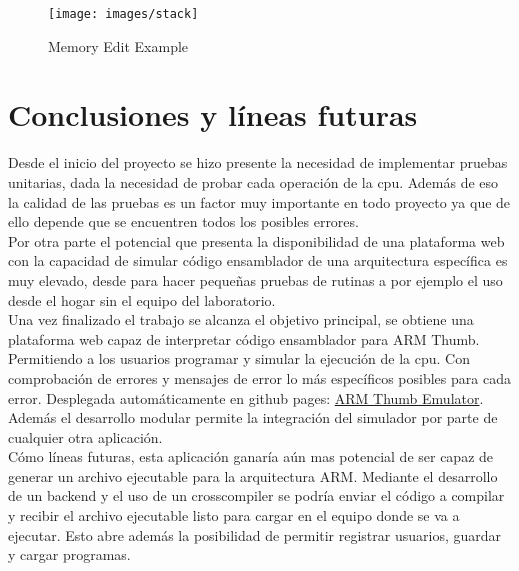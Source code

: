 {{            %


            \begin{figure}[h]
                \centering
                \texttt{[image: images/stack]}
                \caption{Memory Edit Example}
            \end{figure}
        }
    }

\section{Conclusiones y líneas futuras}
{
    Desde el inicio del proyecto se hizo presente la necesidad de implementar pruebas unitarias,
    dada la necesidad de probar cada operación de la cpu. Además de eso la calidad de las pruebas es un factor
    muy importante en todo proyecto ya que de ello depende que se encuentren todos los posibles errores. \\

    Por otra parte el potencial que presenta la disponibilidad de una plataforma web con la capacidad
    de simular código ensamblador de una arquitectura específica es muy elevado, desde para hacer
    pequeñas pruebas de rutinas a por ejemplo el uso desde el hogar sin el equipo del laboratorio. \\

    Una vez finalizado el trabajo se alcanza el objetivo principal, se obtiene una plataforma web
    capaz de interpretar código ensamblador para ARM Thumb. Permitiendo a los usuarios
    programar y simular la ejecución de la cpu. Con comprobación de errores y mensajes de error lo más
    específicos posibles para cada error. Desplegada automáticamente en github pages: \href{https://freddyjs.github.io/wthumb/}{ARM Thumb Emulator}. Además el desarrollo modular permite la integración del simulador
    por parte de cualquier otra aplicación. \\

    Cómo líneas futuras, esta aplicación ganaría aún mas potencial de ser capaz de generar un archivo
    ejecutable para la arquitectura ARM. Mediante el desarrollo de un backend y el uso de un crosscompiler
    se podría enviar el código a compilar y recibir el archivo ejecutable listo para cargar en el equipo donde se
    va a ejecutar. Esto abre además la posibilidad de permitir registrar usuarios, guardar y cargar programas.  
}

